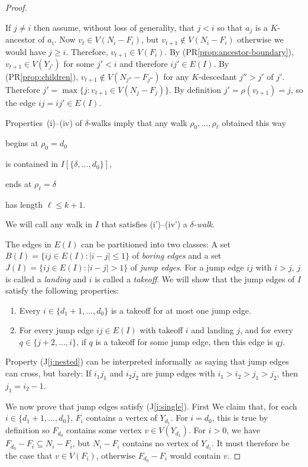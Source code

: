 \documentclass{patmorin}
\renewcommand{\propref}[1]{(PR\ref{prop:#1})}
\newcommand{\jlabel}[1]{\label{j:#1}}
\newcommand{\jref}[1]{(J\ref{j:#1})}
\begin{document}
\begin{proof}
\begin{compactenum}
    \item If $j\neq i$ then assume, without loss of generality, that $j < i$ so that $a_j$ is a $K$-ancestor of $a_i$.  Now $v_t\in V(N_i-F_i)$, but $v_{t+1}\not\in V(N_i-F_i)$ otherwise we would have $j\ge i$. Therefore, $v_{t+1}\in V(F_i)$.  By \propref{ancestor-boundary}, $v_{t+1}\in V(Y_{j'})$ for some $j'< i$ and therefore $ij'\in E(I)$.  By \propref{children}, $v_{t+1}\not\in V(N_{j''}-F_{j''})$ for any $K$-descedant $j''>j'$ of $j'$.  Therefore $j'=\max\{j : v_{t+1}\in V(N_j-F_j)\}$. By definition $j'=\rho(v_{t+1})=j$, so the edge $ij=ij'\in E(I)$. 
  \end{compactenum}

  Properties~(i)--(iv) of $\delta$-walks imply that any walk $\rho_0,\ldots,\rho_\ell$ obtained this way 
  \begin{compactenum}[(i')]
    \item begins at $\rho_0=d_0$ 
    \item is contained in $I[\{\delta,\ldots,d_0\}]$, 
    \item ends at $\rho_\ell=\delta$
    \item has length $\ell \le k+1$.
  \end{compactenum}
  We will call any walk in $I$ that satisfies (i')--(iv') a \emph{$\delta$-walk}.
  
  The edges in $E(I)$ can be partitioned into two classes:  A set $B(I)=\{ij\in E(I): |i-j|\le 1\}$ of \emph{boring edges} and a set $J(I)=\{ij\in E(I): |i-j|>1\}$ of \emph{jump edges}.  For a jump edge $ij$ with $i>j$, $j$ is called a \emph{landing} and $i$ is called a \emph{takeoff}.  We will show that the jump edges of $I$ satisfy the following properties:
  \begin{enumerate}[(J1)]
    \item \jlabel{single} Every $i\in\{d_1+1,\ldots,d_0\}$ is a takeoff for at most one jump edge.
    
    \item \jlabel{nested} For every jump edge $ij\in E(I)$ with takeoff $i$ and landing $j$, and for every $q\in\{j+2,\ldots,i\}$, if $q$ is a takeoff for some jump edge, then this edge is $qj$.
  \end{enumerate}
  Property \jref{nested} can be interpreted informally as saying that jump edges can cross, but barely:  If $i_1j_1$ and $i_2j_2$ are jump edges with $i_1> i_2>j_1>j_2$, then $j_1=i_2-1$.

  We now prove that jump edges satisfy \jref{single}.
  First We claim that, for each $i\in\{d_1+1,\ldots,d_0\}$, $F_{i}$ contains a vertex of $Y_{d_1}$.  For $i=d_0$, this is true by definition so $F_{d_0}$ contains some vertex $v\in V(Y_{d_1})$.  For $i>0$, we have $F_{d_0}-F_{i}\subseteq N_i-F_i$, but $N_i-F_i$ contains no vertex of $Y_{d_1}$. It must therefore be the case that $v\in V(F_i)$, otherwise $F_{d_0}-F_i$ would contain $v$. 
  

\end{proof}
\end{document}
